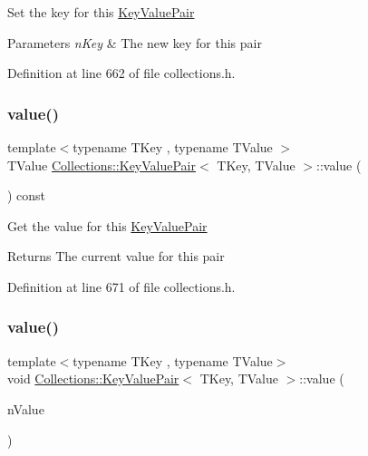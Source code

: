 Set the key for this \hyperlink{class_collections_1_1_key_value_pair}{Key\+Value\+Pair} 
\begin{DoxyParams}{Parameters}
{\em n\+Key} & The new key for this pair \\
\hline
\end{DoxyParams}


Definition at line 662 of file collections.\+h.

\hypertarget{class_collections_1_1_key_value_pair_a7ffc604a86ce512c419a212d6e92ccb0}{}\label{class_collections_1_1_key_value_pair_a7ffc604a86ce512c419a212d6e92ccb0} 
\subsubsection{\texorpdfstring{value()}{value()}\hspace{0.1cm}{\footnotesize\ttfamily [1/2]}}
{\footnotesize\ttfamily template$<$typename T\+Key , typename T\+Value $>$ \\
T\+Value \hyperlink{class_collections_1_1_key_value_pair}{Collections\+::\+Key\+Value\+Pair}$<$ T\+Key, T\+Value $>$\+::value (\begin{DoxyParamCaption}{ }\end{DoxyParamCaption}) const}

Get the value for this \hyperlink{class_collections_1_1_key_value_pair}{Key\+Value\+Pair} \begin{DoxyReturn}{Returns}
The current value for this pair 
\end{DoxyReturn}


Definition at line 671 of file collections.\+h.

\hypertarget{class_collections_1_1_key_value_pair_a7e18d15bccbb04704445daf632cda15d}{}\label{class_collections_1_1_key_value_pair_a7e18d15bccbb04704445daf632cda15d} 
\subsubsection{\texorpdfstring{value()}{value()}\hspace{0.1cm}{\footnotesize\ttfamily [2/2]}}
{\footnotesize\ttfamily template$<$typename T\+Key , typename T\+Value$>$ \\
void \hyperlink{class_collections_1_1_key_value_pair}{Collections\+::\+Key\+Value\+Pair}$<$ T\+Key, T\+Value $>$\+::value (\begin{DoxyParamCaption}\item[{T\+Value}]{n\+Value }\end{DoxyParamCaption})}

